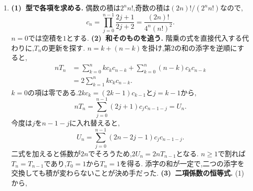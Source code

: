 \begin{enumerate}[label=\textbf{問\arabic*.},leftmargin=3.8em,format=\bookitemlink{practice-entrance}{solution}{problem}]
                  $a_0=2^{m+1}\ell-1$（$\ell$は正整数）が必要である.
                  逆にこの初項から,
                  \[
                    b_j=3^j2^{m+1-j}\ell-1\quad(0\le j\le m)
                  \]
                  とおくと,すべて正の奇数で,$b_0=a_0$かつ$(3b_j+1)/2=b_{j+1}$（$0\le j<m$）である.
                  実際に奇数の分岐で進むため$a_j=b_j$となり,十分性も示せた.
                  最小値は$\ell=1$の$2^{m+1}-1$である.
                  \smallskip\textbf{(3)~奇数区間の長さ.}
                  $s=0$なら初項が偶数なので答えは$0$である.
                  $s\ge1$なら,同じ確認から
                  \[
                    a_j=3^j2^{s-j}t-1\quad(0\le j\le s)
                  \]
                  となる.$j<s$では奇数,$j=s$では偶数なので連続する奇数項は$s$個である.
                  例えば$a_0=7$では$7,11,17,26,\ldots$となる.
                  最初の奇数区間の長さは,$a_0+1$に含まれる$2$の因子で決まる.
          \item \textbf{(1)~型で各項を求める.}
                  偶数の積は$2^nn!$,奇数の積は$(2n)!/(2^nn!)$なので,
                  \[
                    c_n=\prod_{j=0}^{n-1}\frac{2j+1}{2j+2}
                       =\frac{(2n)!}{4^n(n!)^2}.
                  \]
                  $n=0$では空積を$1$とする.
                  \smallskip\textbf{(2)~和そのものを追う.}
                  階乗の式を直接代入する代わりに,$T_n$の更新を探す.
                  $n=k+(n-k)$を掛け,第2の和の添字を逆順にすると,
                  \[
                  \begin{aligned}
                    nT_n&=\sum_{k=0}^n kc_kc_{n-k}
                          +\sum_{k=0}^n(n-k)c_kc_{n-k}\\
                        &=2\sum_{k=1}^n kc_kc_{n-k}.
                  \end{aligned}
                  \]
                  $k=0$の項は零である.$2kc_k=(2k-1)c_{k-1}$と$j=k-1$から,
                  \[
                    nT_n=\sum_{j=0}^{n-1}(2j+1)c_jc_{n-1-j}=U_n.
                  \]
                  今度は$j$を$n-1-j$に入れ替えると,
                  \[
                    U_n=\sum_{j=0}^{n-1}(2n-2j-1)c_jc_{n-1-j}.
                  \]
                  二式を加えると係数が$2n$でそろうため,$2U_n=2nT_{n-1}$となる.
                  $n\ge1$で割れば$T_n=T_{n-1}$であり,$T_0=1$から$T_n=1$を得る.
                  添字の和が一定で,二つの添字を交換しても積が変わらないことが決め手だった.
                  \smallskip\textbf{(3)~二項係数の恒等式.}
                  (1)から,
                  \[
\]
\end{enumerate}

